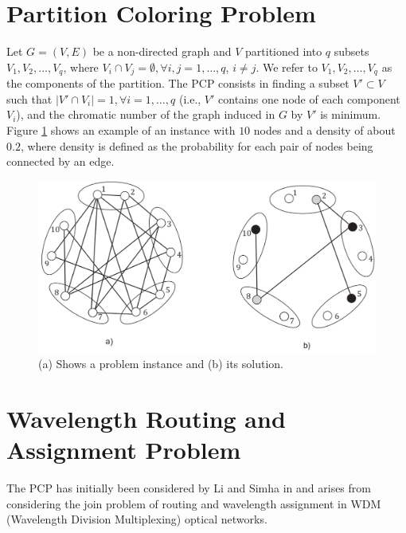 \section{Partition Coloring Problem}

Let $G = (V, E)$ be a non-directed graph and $V$ partitioned into $q$ subsets $V_1, V_2,\ldots, V_q$, where $V_i \cap V_j = \emptyset, \forall i, j = 1, \ldots , q$, $i \neq j$. We refer to $V_1, V_2, \ldots , V_q$ as the components of the partition. The PCP consists in finding a subset $V' \subset V$ such that $|V' \cap V_i| = 1, \forall i = 1, \ldots , q$ (i.e., $V'$ contains one node of each component $V_i$), and the chromatic number of the graph induced in $G$ by $V'$ is minimum.\\
Figure \ref{pd:pcpExample} shows an example of an instance with $10$ nodes and a density of about $0.2$, where density is defined as the probability for each pair of nodes being connected by an edge.

\begin{figure}
\begin{center}
\includegraphics[scale=0.3]{figures/pcp.png}
\caption{(a) Shows a problem instance and (b) its solution.}
\label{pd:pcpExample}
\end{center}
\end{figure}


\section{Wavelength Routing and Assignment Problem}

The PCP has initially been considered by Li and Simha in \cite{li-00} and arises from considering the join problem of routing and wavelength assignment in WDM (Wavelength Division Multiplexing) optical networks. 

